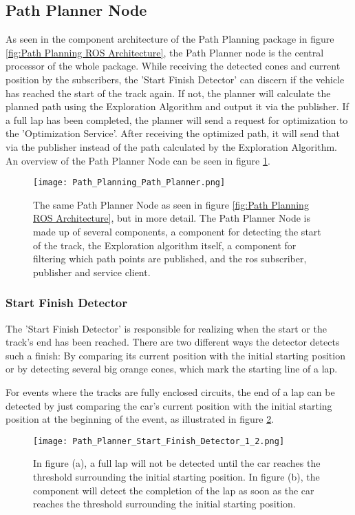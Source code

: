 \subsection{Path Planner Node} \label{sec:Path Planner Node}
As seen in the component architecture of the Path Planning package in figure \ref{fig:Path Planning ROS Architecture}, the Path Planner node is the central processor of the whole package.
While receiving the detected cones and current position by the subscribers, the 'Start Finish Detector' can discern if the vehicle has reached the start of the track again. If not, the planner will calculate the planned path using the Exploration Algorithm and output it via the publisher. If a full lap has been completed, the planner will send a request for optimization to the 'Optimization Service'. After receiving the optimized path, it will send that via the publisher instead of the path calculated by the Exploration Algorithm. An overview of the Path Planner Node can be seen in figure \ref{fig:Path Planning Path Planner Node}.
\begin{figure}[H]
    \centering
    \texttt{[image: Path\_Planning\_Path\_Planner.png]}
    \caption{The same Path Planner Node as seen in figure \ref{fig:Path Planning ROS Architecture}, but in more detail. The Path Planner Node is made up of several components, a component for detecting the start of the track, the Exploration algorithm itself, a component for filtering which path points are published, and the \acrshort{ros} subscriber, publisher and service client.}
    \label{fig:Path Planning Path Planner Node}
\end{figure}

\subsubsection{Start Finish Detector} \label{sec:Start Finish Detector} %
The 'Start Finish Detector' is responsible for realizing when the start or the track's end has been reached. There are two different ways the detector detects such a finish: By comparing its current position with the initial starting position or by detecting several big orange cones, which mark the starting line of a lap.

For events where the tracks are fully enclosed circuits, the end of a lap can be detected by just comparing the car's current position with the initial starting position at the beginning of the event, as illustrated in figure \ref{fig:Path Planner Start Finish Detector 1 and 2}.
\begin{figure}[H]
    \centering
    \texttt{[image: Path\_Planner\_Start\_Finish\_Detector\_1\_2.png]}
    \caption{In figure (a), a full lap will not be detected until the car reaches the threshold surrounding the initial starting position. In figure (b), the component will detect the completion of the lap as soon as the car reaches the threshold surrounding the initial starting position.}
    \label{fig:Path Planner Start Finish Detector 1 and 2}
\end{figure}

